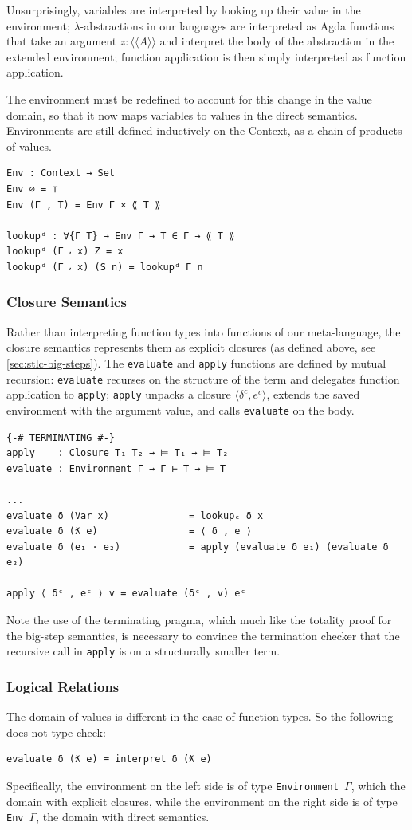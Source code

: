 Unsurprisingly, variables are interpreted by looking up their value in the environment; $\lambda$-abstractions in our languages are interpreted as Agda functions that take an argument $z : \langle \langle A \rangle \rangle$ and interpret the body of the abstraction in the extended environment; function application is then simply interpreted as function application.

The environment must be redefined to account for this change in the value domain, so that it now maps variables to values in the direct semantics.
Environments are still defined inductively on the Context, as a chain of products of values.
\begin{verbatim}
Env : Context → Set
Env ∅ = ⊤
Env (Γ , T) = Env Γ × ⟪ T ⟫

lookupᵈ : ∀{Γ T} → Env Γ → T ∈ Γ → ⟪ T ⟫
lookupᵈ (Γ ⸴ x) Z = x
lookupᵈ (Γ ⸴ x) (S n) = lookupᵈ Γ n
\end{verbatim}


\subsubsection*{Closure Semantics}
Rather than interpreting function types into functions of our meta-language, the closure semantics represents them as explicit closures (as defined above, see \ref{sec:stlc-big-steps}).
The \texttt{evaluate} and \texttt{apply} functions are defined by mutual recursion:
\texttt{evaluate} recurses on the structure of the term and delegates function
application to \texttt{apply}; \texttt{apply} unpacks a closure
$\langle\delta^c, e^c\rangle$, extends the saved environment with the argument value,
and calls \texttt{evaluate} on the body.

\begin{verbatim}
{-# TERMINATING #-}
apply    : Closure T₁ T₂ → ⊨ T₁ → ⊨ T₂
evaluate : Environment Γ → Γ ⊢ T → ⊨ T

...
evaluate δ (Var x)              = lookupₑ δ x
evaluate δ (ƛ e)                = ⟨ δ , e ⟩
evaluate δ (e₁ · e₂)            = apply (evaluate δ e₁) (evaluate δ e₂)

apply ⟨ δᶜ , eᶜ ⟩ v = evaluate (δᶜ , v) eᶜ
\end{verbatim}

Note the use of the terminating pragma, which much like the totality proof for the big-step semantics, is necessary to convince the termination checker that the recursive call in \texttt{apply} is on a structurally smaller term.

\subsubsection*{Logical Relations}
The domain of values is different in the case of function types. So the following does not type check:
\begin{verbatim}
evaluate δ (ƛ e) ≡ interpret δ (ƛ e)
\end{verbatim}
Specifically, the environment on the left side is of type \texttt{Environment~$\Gamma$}, which the domain with explicit closures, while the environment on the right side is of type \texttt{Env~$\Gamma$}, the domain with direct semantics.

